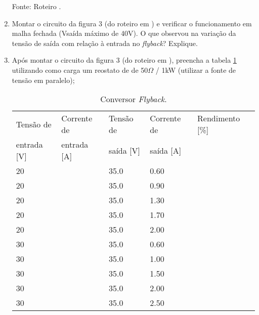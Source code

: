 \begin{enumerate}
\begin{small}
\begin{table}[H]
\begin{center}
                  \small Fonte: Roteiro \cite{Roteiro}.
                \end{center}
              \end{table}
            \end{small}
            
          \item Montar o circuito da figura 3 (do roteiro em \cite{Roteiro}) e verificar o funcionamento em malha fechada (Vsaída máximo de 40V). O que observou na variação da tensão de saída com relação à entrada no \textit{flyback}? Explique.
          
          \item Após montar o circuito da figura 3 (do roteiro em \cite{Roteiro}), preencha a tabela \ref{tab:flyback} utilizando como carga um reostato de de 50$\Omega$ / 1kW (utilizar a fonte de tensão em paralelo);
          
          \begin{small}
            \begin{table}[H]
              \begin{center}
                \caption{Conversor \textit{Flyback}.}
                \begin{tabular}{l|l|l|l|l}
                  \hline
                  Tensão de   &  Corrente de 	& Tensão de & Corrente de	& Rendimento [\%]	\\
                  entrada [V] &  entrada [A] 	& saída [V] & saída [A]  	& \\
                  \hline
                  20 		& 			& 35.0		& 0.60			& 	\\
                  \hline
                  20		& 			& 35.0		& 0.90			& 	\\
                  \hline
                  20		& 			& 35.0		& 1.30			& 	\\
                  \hline
                  20		& 			& 35.0		& 1.70			& 	\\
                  \hline
                  20		& 			& 35.0		& 2.00			& 	\\
                  \hline
                  30		& 			& 35.0		& 0.60			& 	\\
                  \hline
                  30		& 			& 35.0		& 1.00			& 	\\
                  \hline
                  30		& 			& 35.0		& 1.50			& 	\\
                  \hline
                  30		& 			& 35.0		& 2.00			& 	\\
                  \hline
                  30		& 			& 35.0		& 2.50			& 	\\
                  \hline
                \end{tabular}
                \label{tab:flyback}
                

\end{center}
\end{table}
\end{small}
\end{enumerate}
